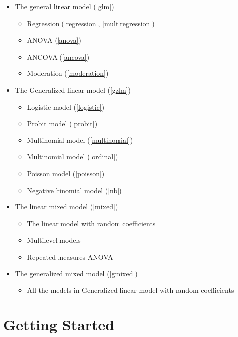 \documentclass[
]{book}
\providecommand{\tightlist}{%
  \setlength{\itemsep}{0pt}\setlength{\parskip}{0pt}}
\begin{document}
\begin{itemize}
\tightlist
\item
  The general linear model (\ref{glm})

  \begin{itemize}
  \tightlist
  \item
    Regression (\ref{regression}, \ref{multiregression})
  \item
    ANOVA (\ref{anova})
  \item
    ANCOVA (\ref{ancova})
  \item
    Moderation (\ref{moderation})
  \end{itemize}
\item
  The Generalized linear model (\ref{gzlm})

  \begin{itemize}
  \tightlist
  \item
    Logistic model (\ref{logistic})
  \item
    Probit model (\ref{probit})
  \item
    Multinomial model (\ref{multinomial})
  \item
    Multinomial model (\ref{ordinal})
  \item
    Poisson model (\ref{poisson})
  \item
    Negative binomial model (\ref{nb})
  \end{itemize}
\item
  The linear mixed model (\ref{mixed})

  \begin{itemize}
  \tightlist
  \item
    The linear model with random coefficients
  \item
    Multilevel models
  \item
    Repeated measures ANOVA
  \end{itemize}
\item
  The generalized mixed model (\ref{gmixed})

  \begin{itemize}
  \tightlist
  \item
    All the models in Generalized linear model with random coefficients
  \end{itemize}
\end{itemize}

\hypertarget{getstarted}{%
\section{Getting Started}\label{getstarted}}
\end{document}
